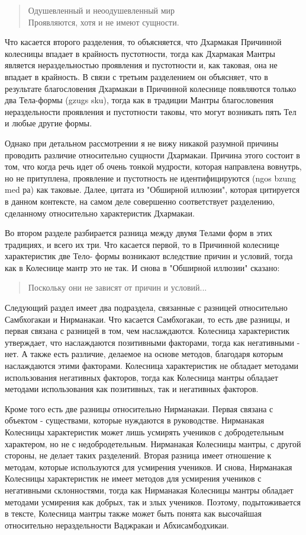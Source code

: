 \begin{verse}
Одушевленный и неоодушевленный мир\\
Проявляются, хотя и не имеют сущности.
\end{verse}

Что касается второго разделения, то объясняется, что Дхармакая Причинной
колесницы впадает в крайность пустотности, тогда как Дхармакая Мантры является
нераздельностью проявления и пустотности и, как таковая, она не впадает в крайность. В
связи с третьим разделением он объясняет, что в результате благословения Дхармакаи в
Причинной колеснице появляются только два Тела-формы (gzugs sku), тогда как в традиции
Мантры благословения нераздельности проявления и пустотности таковы, что могут
возникать пять Тел и любые другие формы.

Однако при детальном рассмотрении я не вижу никакой разумной причины проводить
различие относительно сущности Дхармакаи. Причина этого состоит в том, что когда речь
идет об очень тонкой мудрости, которая направлена вовнутрь, но не притуплена, проявление
и пустотность не идентифицируются (ngos bzung med ра) как таковые. Далее, цитата из
"Обширной иллюзии", которая цитируется в данном контексте, на самом деле совершенно
соответствует разделению, сделанному относительно характеристик Дхармакаи.

Во втором разделе разбирается разница между двумя Телами форм в этих традициях,
и всего их три. Что касается первой, то в Причинной колеснице характеристик две Тело-
формы возникают вследствие причин и условий, тогда как в Колеснице мантр это не так. И
снова в "Обширной иллюзии" сказано:

\begin{verse}
Поскольку они не зависят от причин и условий...
\end{verse}

Следующий раздел имеет два подраздела, связанные с разницей относительно
Самбхогакаи и Нирманакаи. Что касается Самбхогакаи, то есть две разницы, и первая
связана с разницей в том, чем наслаждаются. Колесница характеристик утверждает, что
наслаждаются позитивными факторами, тогда как негативными - нет. А также есть различие,
делаемое на основе методов, благодаря которым наслаждаются этими факторами. Колесница
характеристик не обладает методами использования негативных факторов, тогда как
Колесница мантры обладает методами использования как позитивных, так и негативных
факторов.

Кроме того есть две разницы относительно Нирманакаи. Первая связана с объектом -
существами, которые нуждаются в руководстве. Нирманакая Колесницы характеристик
может лишь усмирять учеников с добродетельным характером, но не с недобродетельным.
Нирманакая Колесницы мантры, с другой стороны, не делает таких разделений. Вторая
разница имеет отношение к методам, которые используются для усмирения учеников. И
снова, Нирманакая Колесницы характеристик не имеет методов для усмирения учеников с
негативными склонностями, тогда как Нирманакая Колесницы мантры обладает методами
усмирения как добрых, так и злых учеников. Поэтому, подытоживается в тексте, Колесница
мантры также может быть понята как высочайшая относительно нераздельности Ваджракаи
и Абхисамбодхикаи.

